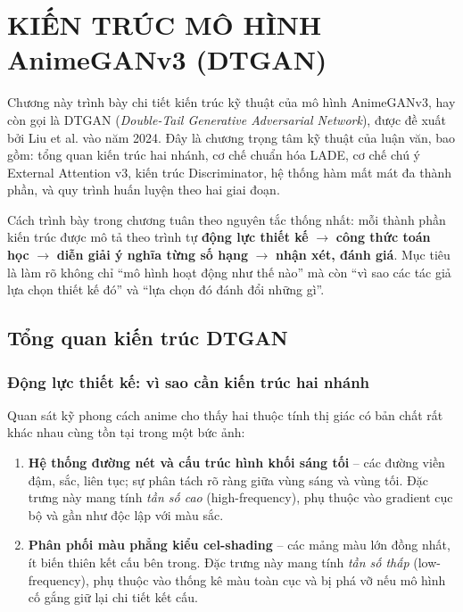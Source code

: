 \clearpage


\setcounter{chapter}{1}
\chapter[{KIẾN TRÚC MÔ HÌNH AnimeGANv3 (DTGAN)}]{KIẾN TRÚC MÔ HÌNH AnimeGANv3 (DTGAN)}

Chương này trình bày chi tiết kiến trúc kỹ thuật của mô hình AnimeGANv3, hay còn gọi là DTGAN (\textit{Double-Tail Generative Adversarial Network}), được đề xuất bởi Liu et al. \cite{Liu2024} vào năm 2024. Đây là chương trọng tâm kỹ thuật của luận văn, bao gồm: tổng quan kiến trúc hai nhánh, cơ chế chuẩn hóa LADE, cơ chế chú ý External Attention v3, kiến trúc Discriminator, hệ thống hàm mất mát đa thành phần, và quy trình huấn luyện theo hai giai đoạn.

Cách trình bày trong chương tuân theo nguyên tắc thống nhất: mỗi thành phần kiến trúc được mô tả theo trình tự \textbf{động lực thiết kế} $\rightarrow$ \textbf{công thức toán học} $\rightarrow$ \textbf{diễn giải ý nghĩa từng số hạng} $\rightarrow$ \textbf{nhận xét, đánh giá}. Mục tiêu là làm rõ không chỉ ``mô hình hoạt động như thế nào'' mà còn ``vì sao các tác giả lựa chọn thiết kế đó'' và ``lựa chọn đó đánh đổi những gì''.

\section{Tổng quan kiến trúc DTGAN}
\label{sec:dtgan_overview}

\subsection{Động lực thiết kế: vì sao cần kiến trúc hai nhánh}
\label{subsec:why_double_tail}

Quan sát kỹ phong cách anime cho thấy hai thuộc tính thị giác có bản chất rất khác nhau cùng tồn tại trong một bức ảnh:

\begin{enumerate}
    \item \textbf{Hệ thống đường nét và cấu trúc hình khối sáng tối} -- các đường viền đậm, sắc, liên tục; sự phân tách rõ ràng giữa vùng sáng và vùng tối. Đặc trưng này mang tính \textit{tần số cao} (high-frequency), phụ thuộc vào gradient cục bộ và gần như độc lập với màu sắc.
    \item \textbf{Phân phối màu phẳng kiểu cel-shading} -- các mảng màu lớn đồng nhất, ít biến thiên kết cấu bên trong. Đặc trưng này mang tính \textit{tần số thấp} (low-frequency), phụ thuộc vào thống kê màu toàn cục và bị phá vỡ nếu mô hình cố gắng giữ lại chi tiết kết cấu.
\end{enumerate}

